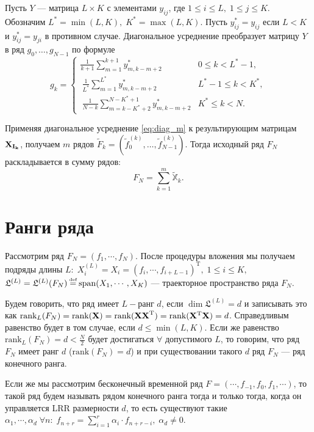 \documentclass[specialist, substylefile = spbu.rtx,
			   subf, href, 12pt]{disser}
\newcommand\eqdef{\mathrel{\stackrel{\makebox[0pt]{\mbox{\normalfont\tiny def}}}{=}}}
\begin{document}
Пусть $Y$ --- матрица $L \times K$ с элементами $y_{ij}$, где $1 \leq i \leq L,\; 1 \leq j \leq K$. Обозначим $L^* = \min(L, K), \; K^* = \max(L, K)$. Пусть $y_{ij}^* = y_{ij}$ если $L<K$ и $y_{ij}^* = y_{ji}$ в противном случае. Диагональное усреднение преобразует матрицу $Y$ в ряд $g_0, \dotsc, g_{N-1}$ по формуле
\begin{equation}\label{eq:diag_m}
	g_k = 
	\begin{cases}
		\frac{1}{k+1}\sum\limits_{m=1}^{k+1}y_{m, k-m+2}^* & 0 \leq k < L^* -1, \\\
		\frac{1}{L^*}\sum\limits_{m=1}^{L^*}y_{m, k-m+2}^* & L^* - 1 \leq k < K^*, \\\
		\frac{1}{N-k}\sum\limits_{m=k - K^* + 2}^{N - K^* + 1}y_{m, k-m+2}^* & K^* \leq k < N.
	\end{cases}
\end{equation}

Применяя диагональное усреднение \eqref{eq:diag_m} к результирующим матрицам $\bold{X_{I_k}}$, получаем $m$ рядов $\widetilde{F}_{k} = (\widetilde{f}_0^{(k)}, \dotsc, \widetilde{f}_{N-1}^{(k)})$. Тогда исходный ряд $F_N$ раскладывается в сумму рядов:
$$F_N = \sum\limits_{k=1}^{m}\widetilde{\mathbb{X}}_k.$$

\section{Ранги ряда}
Рассмотрим ряд $F_N = (f_1,\cdots,f_N)$. После процедуры вложения мы получаем подряды длины $L:\; X_i^{(L)} = X_i = (f_{i}, \cdots, f_{i+L-1})^\mathrm{T}, \; 1 \leq i \leq K,$ $\mathfrak{L}^{(L)} = \mathfrak{L}^{(L)}(F_N) \eqdef \mathrm{span}(X_1, \cdots, X_K)$ --- траекторное пространство ряда $F_N$.

Будем говорить, что ряд имеет $ L- $ранг $d$, если $\dim\mathfrak{L}^{(L)} = d$ и записывать это как $\textrm{rank}_L(F_N) = \textrm{rank}(\bold{X}) = \textrm{rank}(\bold{XX}^\mathrm{T}) = \textrm{rank}(\bold{X}^\mathrm{T}\bold{X}) = d$. Справедливым равенство будет в том случае, если $d\leq\min(L, K)$. Если же равенство $\textrm{rank}_L(F_N) = d < \frac{N}{2}$ будет достигаться $\forall$ допустимого $L$, то говорим, что ряд $F_N$ имеет ранг $d$ ($\textrm{rank}(F_N) = d$) и при существовании такого $d$ ряд $F_N$ --- ряд конечного ранга.

Если же мы рассмотрим бесконечный временной ряд $F=(\cdots, f_{-1}, f_0, f_1, \cdots)$, то такой ряд будем называть рядом конечного ранга тогда и только тогда, когда он управляется LRR размерности $d$, то есть существуют такие $\alpha_1, \cdots, \alpha_d \; \forall n: \; f_{n+r} = \sum_{i=1}^{r} \alpha_i\cdot f_{n+r-i}, \; \alpha_d \neq 0$.
\end{document}
